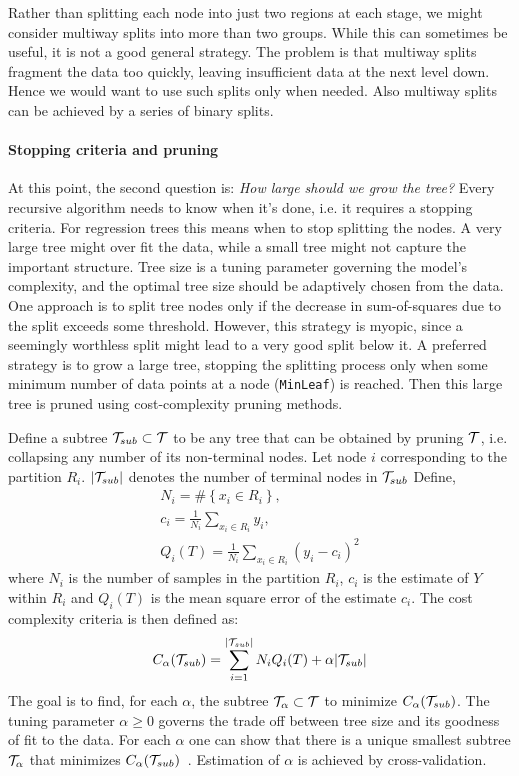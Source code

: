 \textcolor[rgb]{0,0,1}{
Rather than splitting each node into just two regions at each stage, we might consider multiway splits into more than two groups. 
While this can sometimes be useful, it is not a good general strategy. The problem is that multiway splits fragment the data too quickly, leaving insufficient data at the next level down. 
Hence we would want to use such splits only when needed. 
Also multiway splits can be achieved by a series of binary splits.}

\textcolor[rgb]{0,0,1}{
\paragraph{\textbf{Stopping criteria and pruning}}
At this point, the second question is: \emph{How large should we grow the tree?}
Every recursive algorithm needs to know when it's done, i.e. it requires a stopping criteria. 
For regression trees this means when to stop splitting the nodes. 
A very large tree might over fit the data, while a small tree might not capture the important structure.
Tree size is a tuning parameter governing the model’s complexity, and the optimal tree size should be adaptively chosen from the data. 
One approach is to split tree nodes only if the decrease in sum-of-squares due to the split exceeds some threshold. 
However, this strategy is myopic, since a seemingly worthless split might lead to a very good split below it.
A preferred strategy is to grow a large tree, stopping the splitting process only when some minimum number of data points at a node (\texttt{MinLeaf}) is reached. Then this large tree is pruned using cost-complexity pruning methods.}

\textcolor[rgb]{0,0,1}{
Define a subtree $\mathcal{T}_{sub} \subset \mathcal{T}$ to be any tree that can be obtained by pruning $\mathcal{T}$, i.e. collapsing any number of its non-terminal nodes. 
Let node $i$ corresponding to the partition $R_i$. $|\mathcal{T}_{sub}|$ denotes the number of terminal nodes in $\mathcal{T}_{sub}$
Define,
\begin{equation}
\begin{aligned}
N_i = \# \left\lbrace x_i \in R_i \right\rbrace,\\
c_i = \frac{1}{N_i} \sum_{x_i \in R_i} y_i, \\
Q_i(T) = \frac{1}{N_i} \sum_{x_i \in R_i} (y_i - c_i)^2
\end{aligned}
\end{equation}
where $N_i$ is the number of samples in the partition $R_i$, $c_i$ is the estimate of $Y$ within $R_i$ and $Q_i(T)$ is the mean square error of the estimate $c_i$. The cost complexity criteria is then defined as:
\begin{equation}
C_{\alpha}(\mathcal{T}_{sub}) = \sum_{i=1}^{|\mathcal{T}_{sub}|} N_i Q_i(T) + \alpha |\mathcal{T}_{sub}|
\end{equation}
The goal is to find, for each $\alpha$, the subtree $\mathcal{T}_{\alpha} \subset \mathcal{T}$ to minimize $C_{\alpha}(\mathcal{T}_{sub})$. 
The tuning parameter $\alpha \geq 0$ governs the trade off between tree size and its goodness of fit to the data.
For each $\alpha$ one can show that there is a unique smallest subtree $\mathcal{T}_{\alpha}$ that minimizes $C_{\alpha}(\mathcal{T}_{sub})$~\cite{Ripley96}. Estimation of $\alpha$ is achieved by cross-validation.}